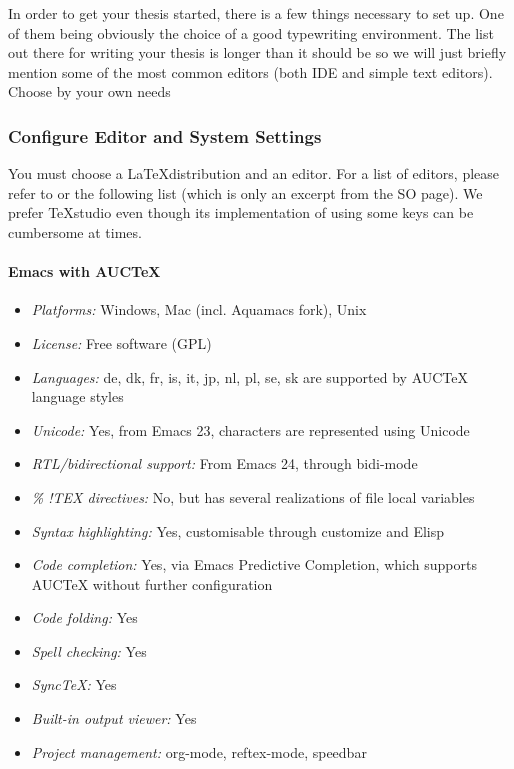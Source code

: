 In order to get your thesis started, there is a few things necessary to set up.
One of them being obviously the choice of a good typewriting environment.
The list out there for writing your thesis is longer than it should be so we will just briefly mention some of the most common editors (both IDE and simple text editors).
Choose by your own needs


\subsubsection{Configure Editor and System Settings}\label{sec:user-documentation:configure-system}

You must choose a \LaTeX distribution and an editor.
For a list of editors, please refer to or the following list (which is only an excerpt from the SO page).
We prefer TeXstudio even though its implementation of using some keys can be cumbersome at times.

\paragraph{Emacs with AUCTeX}

\begin{itemize}
    \item \textit{Platforms:} Windows, Mac (incl. Aquamacs fork), Unix
    \item \textit{License:} Free software (GPL)
    \item \textit{Languages:} de, dk, fr, is, it, jp, nl, pl, se, sk are supported by AUCTeX language styles
    \item \textit{Unicode:} Yes, from Emacs 23, characters are represented using Unicode
    \item \textit{RTL/bidirectional support:} From Emacs 24, through bidi-mode
    \item \textit{\% !TEX directives:} No, but has several realizations of file local variables
    \item \textit{Syntax highlighting:} Yes, customisable through customize and Elisp
    \item \textit{Code completion:} Yes, via Emacs Predictive Completion, which supports AUCTeX without further configuration
    \item \textit{Code folding:} Yes
    \item \textit{Spell checking:} Yes
    \item \textit{SyncTeX:} Yes
    \item \textit{Built-in output viewer:} Yes
    \item \textit{Project management:} org-mode, reftex-mode, speedbar
\end{itemize}

